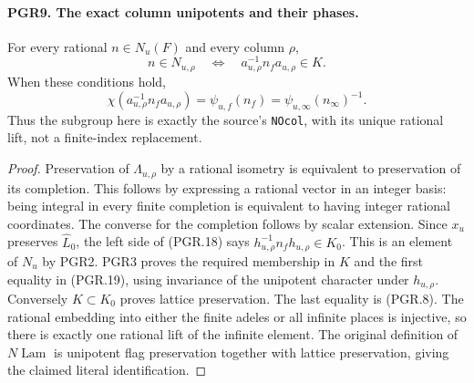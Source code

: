 \documentclass[11pt,a4paper]{article}
\numberwithin{equation}{section}
\theoremstyle{remark}\newtheorem{remark}[theorem]{Remark}
\begin{document}
\paragraph{PGR9. The exact column unipotents and their phases.}
\label{claim:PGR9}
For every rational \(n\in N_u(F)\) and every column \(\rho\),
\[
 n\in N_{u,\rho}\quad\Longleftrightarrow\quad
             a_{u,\rho}^{-1}n_fa_{u,\rho}\in K.
\tag{PGR.18}
\]
When these conditions hold,
\[
 \chi(a_{u,\rho}^{-1}n_fa_{u,\rho})=\psi_{u,f}(n_f)
                              =\psi_{u,\infty}(n_\infty)^{-1}.
\tag{PGR.19}
\]
Thus the subgroup here is exactly the source's \texttt{NOcol},
with its unique rational lift, not a finite-index replacement.
\begin{proof}
Preservation of \(\Lambda_{u,\rho}\) by a rational isometry is
equivalent to preservation of its completion.  This follows by
expressing a rational vector in an integer basis: being integral
in every finite completion is equivalent to having integer rational
coordinates.  The converse for the completion follows by scalar
extension.  Since \(x_u\) preserves \(\widehat L_0\), the
left side of (PGR.18) says
\(h_{u,\rho}^{-1}n_fh_{u,\rho}\in K_0\).
This is an element of \(N_u\) by PGR2.  PGR3 proves the required
membership in \(K\) and the first equality in (PGR.19), using
invariance of the unipotent character under \(h_{u,\rho}\).
Conversely \(K\subset K_0\) proves lattice preservation.
The last equality is (PGR.8).  The rational embedding into either
the finite adeles or all infinite places is injective, so there is
exactly one rational lift of the infinite element.  The original
definition of \(N\!\operatorname{Lam}\) is unipotent flag
preservation together with lattice preservation, giving the claimed
literal identification.
\end{proof}

\end{document}
